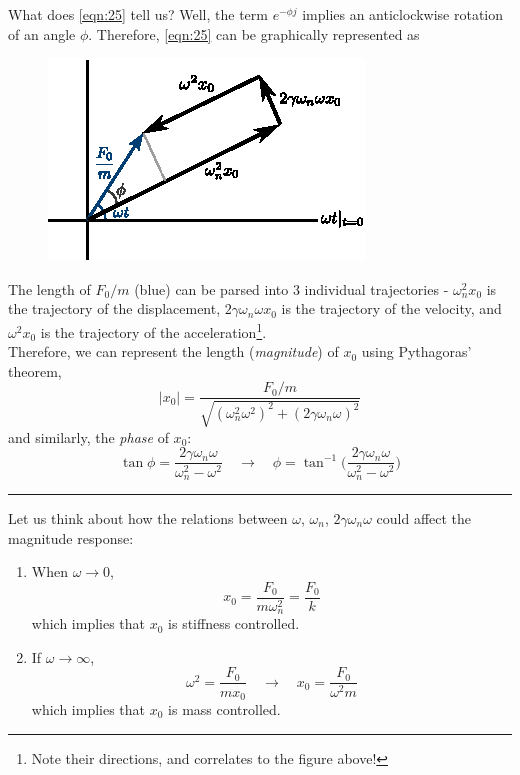 \documentclass[12pt,a4paper]{article}
\begin{document}
\begin{tcolorbox}[breakable, title=Solution Procedure and Discussions]
What does \autoref{eqn:25} tell us? Well, the term $e^{-\phi j}$ implies an anticlockwise rotation of an angle $\phi$. Therefore, \autoref{eqn:25} can be graphically represented as
\begin{figure}[H]
    \centering
    \includegraphics[width=.55\textwidth]{rotation_geo.eps}
\end{figure}
The length of $F_0/m$ (blue) can be parsed into 3 individual trajectories - $\omega_{n}^2 x_0$ is the trajectory of the displacement, $2\gamma\omega_{n}\omega x_0$ is the trajectory of the velocity, and $\omega^2 x_0$ is the trajectory of the acceleration\footnote{Note their directions, and correlates to the figure above!}. \\

Therefore, we can represent the length (\textit{magnitude}) of $x_0$ using Pythagoras' theorem,
\begin{equation}
    \lvert x_{0} \rvert = \frac{F_{0}/m}{\sqrt{(\omega_{n}^{2} \omega^{2})^{2}+(2\gamma\omega_{n}\omega)^{2}}}
\end{equation}
and similarly, the \textit{phase} of $x_0$:
\begin{equation}
    \tan \phi = \frac{2\gamma \omega_{n}\omega}{\omega_{n}^{2}-\omega^{2}} \quad \to \quad \phi = \tan^{-1} \bigg(\frac{2\gamma \omega_{n}\omega}{\omega_{n}^{2}-\omega^{2}}\bigg)
\end{equation}

\hrule \vspace{.5cm}

Let us think about how the relations between $\omega$, $\omega_{n}$, $2\gamma\omega_{n}\omega$ could affect the magnitude response:
\begin{enumerate}
	\item When $\omega\to 0$, 
    \[
        x_{0} = \frac{F_{0}}{m\omega_{n}^{2}}=\frac{F_{0}}{k}
    \] 
    which implies that $x_{0}$ is stiffness controlled.
 
	\item If $\omega\to\infty$, 
    \[
        \omega^{2}=\frac{F_{0}}{mx_{0}} \quad \to \quad x_{0}=\frac{F_{0}}{\omega^{2}m}
    \] 
    which implies that $x_{0}$ is mass controlled.
 

\end{enumerate}
\end{tcolorbox}
\end{document}
